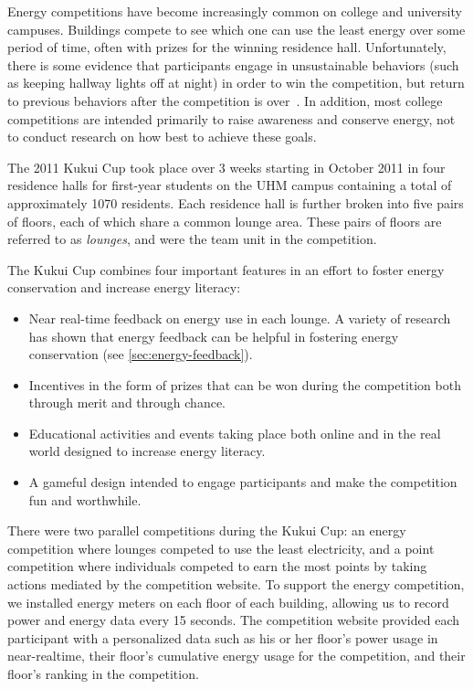 Energy competitions have become increasingly common on college and university campuses. Buildings compete to see which one can use the least energy over some period of time, often with prizes for the winning residence hall. Unfortunately, there is some evidence that participants engage in unsustainable behaviors (such as keeping hallway lights off at night) in order to win the competition, but return to previous behaviors after the competition is over~\cite{petersen-dorm-energy-reduction}. In addition, most college competitions are intended primarily to raise awareness and conserve energy, not to conduct research on how best to achieve these goals.

The 2011 Kukui Cup took place over 3 weeks starting in October 2011 in four residence halls for first-year students on the UHM campus containing a total of approximately 1070 residents. Each residence hall is further broken into five pairs of floors, each of which share a common lounge area. These pairs of floors are referred to as \emph{lounges}, and were the team unit in the competition.

The Kukui Cup combines four important features in an effort to foster energy conservation and increase energy literacy:

\begin{itemize}
	\item Near real-time feedback on energy use in each lounge. A variety of research has shown that energy feedback can be helpful in fostering energy conservation (see \autoref{sec:energy-feedback}).
	\item Incentives in the form of prizes that can be won during the competition both through merit and through chance.
	\item Educational activities and events taking place both online and in the real world designed to increase energy literacy.
	\item A gameful design intended to engage participants and make the competition fun and worthwhile.
\end{itemize}

There were two parallel competitions during the Kukui Cup: an energy competition where lounges competed to use the least electricity, and a point competition where individuals competed to earn the most points by taking actions mediated by the competition website. To support the energy competition, we installed energy meters on each floor of each building, allowing us to record power and energy data every 15 seconds. The competition website provided each participant with a personalized data such as his or her floor's power usage in near-realtime, their floor's cumulative energy usage for the competition, and their floor's ranking in the competition.

